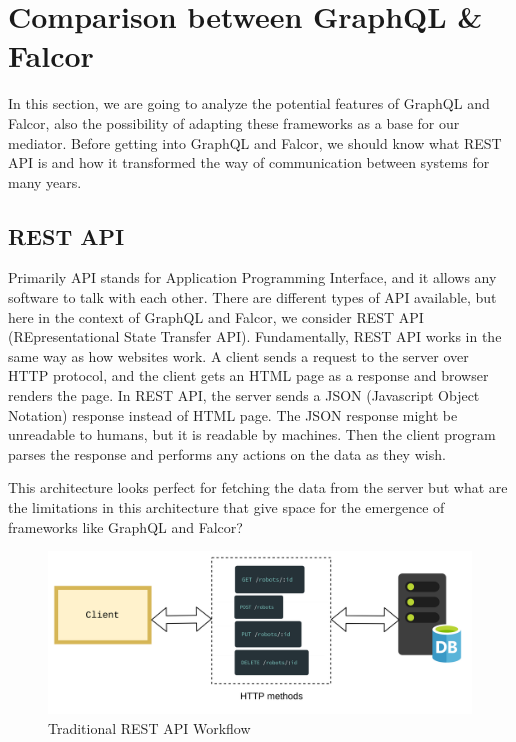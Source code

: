 

    \section{Comparison between GraphQL \& Falcor} \label{sec:graphql_falcor}
	In this section, we are going to analyze the potential features of GraphQL and Falcor, also the possibility of adapting these frameworks as a base for our mediator. Before getting into GraphQL and Falcor, we should know what REST API is and how it transformed the way of communication between systems for many years.
    \subsection{REST API}
	Primarily API stands for Application Programming Interface, and it allows any software to talk with each other. There are different types of API available, but here in the context of GraphQL and Falcor, we consider REST API (REpresentational State Transfer API).  Fundamentally, REST API works in the same way as how websites work. A client sends a request to the server over HTTP protocol, and the client gets an HTML page as a response and browser renders the page. In REST API, the server sends a JSON (Javascript Object Notation) response instead of HTML page. The JSON response might be unreadable to humans, but it is readable by machines. Then the client program parses the response and performs any actions on the data as they wish. 

	This architecture looks perfect for fetching the data from the server but what are the limitations in this architecture that give space for the emergence of frameworks like GraphQL and Falcor?
	
	\begin{figure}[!htbp] 
		\begin{center}
			\includegraphics[trim={0 0 0 2cm},clip,scale=0.105]{./images/png/rest_workflow}	
			\caption{Traditional REST API Workflow}	
			\label{fig:rest_workflow}	
		\end{center}
	\end{figure}
	
